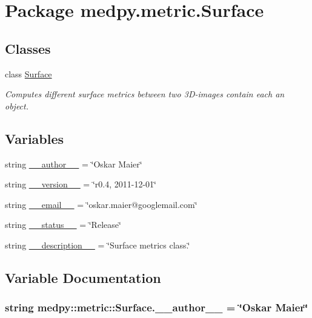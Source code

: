 \hypertarget{namespacemedpy_1_1metric_1_1Surface}{
\section{Package medpy.metric.Surface}
\label{namespacemedpy_1_1metric_1_1Surface}
}
\subsection*{Classes}
\begin{DoxyCompactItemize}
\item 
class \hyperlink{classmedpy_1_1metric_1_1Surface_1_1Surface}{Surface}
\begin{DoxyCompactList}\small\item\em Computes different surface metrics between two 3D-\/images contain each an object. \end{DoxyCompactList}\end{DoxyCompactItemize}
\subsection*{Variables}
\begin{DoxyCompactItemize}
\item 
string \hyperlink{namespacemedpy_1_1metric_1_1Surface_a403db032077da6dc7bf5eafbe8f6c499}{\_\-\_\-author\_\-\_\-} = \char`\"{}Oskar Maier\char`\"{}
\item 
string \hyperlink{namespacemedpy_1_1metric_1_1Surface_a6ee35c2b6fd0a8587a1806936a0ed117}{\_\-\_\-version\_\-\_\-} = \char`\"{}r0.4, 2011-\/12-\/01\char`\"{}
\item 
string \hyperlink{namespacemedpy_1_1metric_1_1Surface_a384ea5bbe67f8e02ae76af36051b1126}{\_\-\_\-email\_\-\_\-} = \char`\"{}oskar.maier@googlemail.com\char`\"{}
\item 
string \hyperlink{namespacemedpy_1_1metric_1_1Surface_af6d263a2c57ce317bd91c16461117193}{\_\-\_\-status\_\-\_\-} = \char`\"{}Release\char`\"{}
\item 
string \hyperlink{namespacemedpy_1_1metric_1_1Surface_a410c4ce138aacce9152113e9f7124a51}{\_\-\_\-description\_\-\_\-} = \char`\"{}Surface metrics class.\char`\"{}
\end{DoxyCompactItemize}


\subsection{Variable Documentation}
\hypertarget{namespacemedpy_1_1metric_1_1Surface_a403db032077da6dc7bf5eafbe8f6c499}{
\subsubsection[{\_\-\_\-author\_\-\_\-}]{\setlength{\rightskip}{0pt plus 5cm}string {\bf medpy::metric::Surface.\_\-\_\-author\_\-\_\-} = \char`\"{}Oskar Maier\char`\"{}}}
\label{namespacemedpy_1_1metric_1_1Surface_a403db032077da6dc7bf5eafbe8f6c499}


